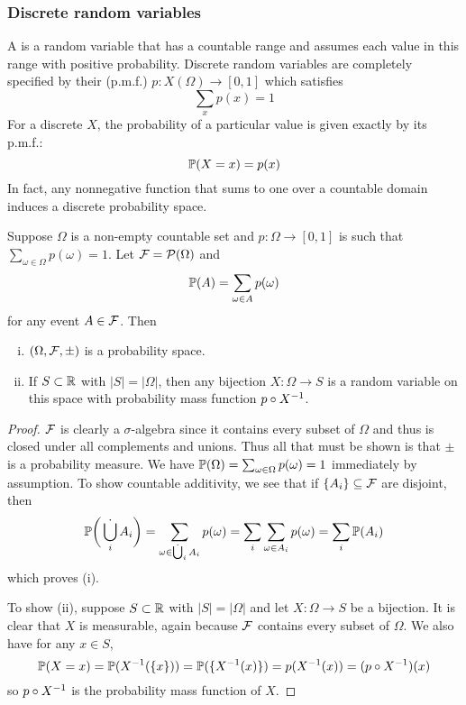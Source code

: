 \documentclass{article}
\begin{document}
\subsubsection{Discrete random variables}
A  is a random variable that has a countable range and assumes each value in this range with positive probability.
Discrete random variables are completely specified by their  (p.m.f.) $p : X(\Omega) \to [0,1]$ which satisfies
\[\sum_x p(x) = 1\]
For a discrete $X$, the probability of a particular value is given exactly by its p.m.f.:
\[\mathbb{P}(X = x) = p(x)\]
In fact, any nonnegative function that sums to one over a countable domain induces a discrete probability space.
\begin{proposition}
Suppose $\Omega$ is a non-empty countable set and $p : \Omega \to [0,1]$ is such that $\sum_{\omega \in \Omega} p(\omega) = 1$.
Let $\mathcal{F} = \mathcal{P}(\Omega)$ and
\[\mathbb{P}(A) = \sum_{\omega \in A} p(\omega)\]
for any event $A \in \mathcal{F}$.
Then
\begin{enumerate}[(i)]
\item $(\Omega, \mathcal{F}, \pm)$ is a probability space.
\item If $S \subset \mathbb{R}$ with $|S| = |\Omega|$, then any bijection $X : \Omega \to S$ is a random variable on this space with probability mass function $p \circ X^{-1}$.
\end{enumerate}
\end{proposition}
\begin{proof}
$\mathcal{F}$ is clearly a $\sigma$-algebra since it contains every subset of $\Omega$ and thus is closed under all complements and unions.
Thus all that must be shown is that $\pm$ is a probability measure.
We have $\mathbb{P}(\Omega) = \sum_{\omega \in \Omega} p(\omega) = 1$ immediately by assumption.
To show countable additivity, we see that if $\{A_i\} \subseteq \mathcal{F}$ are disjoint, then
\[\mathbb{P}\bigg(\mathop{\dot{\bigcup}}_i A_i\bigg) = \sum_{\omega \in \mathop{\dot{\bigcup}}_i A_i} p(\omega) = \sum_i \sum_{\omega \in A_i} p(\omega) = \sum_i \mathbb{P}(A_i)\]
which proves (i).

To show (ii), suppose $S \subset \mathbb{R}$ with $|S| = |\Omega|$ and let $X : \Omega \to S$ be a bijection.
It is clear that $X$ is measurable, again because $\mathcal{F}$ contains every subset of $\Omega$.
We also have for any $x \in S$,
\[\mathbb{P}(X = x) = \mathbb{P}(X^{-1}(\{x\})) = \mathbb{P}(\{X^{-1}(x)\}) = p(X^{-1}(x)) = (p \circ X^{-1})(x)\]
so $p \circ X^{-1}$ is the probability mass function of $X$.
\end{proof}
\end{document}
